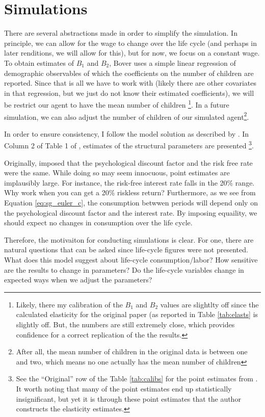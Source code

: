 \documentclass[ProjectMMD]{subfiles}
\begin{document}
\section{Simulations}
There are several abstractions made in order to simplify the simulation. In principle, we can allow for the wage to change over the life cycle (and perhaps in later renditions, we will allow for this), but for now, we focus on a constant wage. To obtain estimates of $B_1$ and $B_2$, Bover uses a simple linear regression of demographic observables of which the coefficients on the number of children are reported. Since that is all we have to work with (likely there are other covariates in that regression, but we just do not know their estimated coefficients), we will be restrict our agent to have the mean number of children \footnote{Likely, there my calibration of the $B_1$ and $B_2$ values are slightlty off since the calculated elasticity for the original paper (as reported in Table \ref{tab:elasts} is slightly off. But, the numbers are still extremely close, which provides confidence for a correct replication of the the \cite{bover1991relaxing} results.}. In a future simulation, we can also adjust the number of children of our simulated agent\footnote{After all, the mean number of children in the original data is between one and two, which means no one actually has the mean number of children}.   

In order to ensure consistency, I follow the model solution as described by \cite{bover1991relaxing}. In Column 2 of Table 1 of \cite{bover1991relaxing}, estimates of the structural parameters are presented \footnote{See the ``Original'' row of the Table \ref{tab:calibs} for the point estimates from \cite{bover1991relaxing}. It worth noting that many of the point estimates end up statistically insignificant, but yet it is through these point estimates that the author constructs the elasticity estimates. }.

Originally, \cite{bover1991relaxing} imposed that the psychological discount factor and the risk free rate were the same. While doing so may seem innocuous, point estimates are implausibly large. For instance, the risk-free interest rate falls in the 20\% range. Why work when you can get a 20\% riskless return? Furthermore, as we see from Equation \eqref{eq:sg_euler_c}, the consumption betwwen periods will depend only on the psychological discount factor and the interest rate. By imposing equaility, we should expect no changes in consumption over the life cycle.

Therefore, the motivaiton for conducting simulations is clear. For one, there are natural questions that can be asked since life-cycle figures were not presented. What does this model suggest about life-cycle consumption/labor? How sensitive are the results to change in parameters? Do the life-cycle variables change in expected ways when we adjust the parameters?
\end{document}
